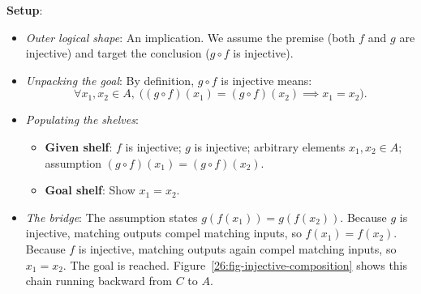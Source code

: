 \textbf{Setup}:
\begin{itemize}
\item \emph{Outer logical shape}: An implication. We assume the premise (both $f$ and $g$ are injective) and target the conclusion ($g \circ f$ is injective).
\item \emph{Unpacking the goal}: By definition, $g \circ f$ is injective means:
\[
\forall x_1, x_2 \in A, \; \bigl((g \circ f)(x_1) = (g \circ f)(x_2) \implies x_1 = x_2\bigr).
\]
\item \emph{Populating the shelves}:
\begin{itemize}
\item \textbf{Given shelf}: $f$ is injective; $g$ is injective; arbitrary elements $x_1, x_2 \in A$; assumption $(g \circ f)(x_1) = (g \circ f)(x_2)$.
\item \textbf{Goal shelf}: Show $x_1 = x_2$.
\end{itemize}
\item \emph{The bridge}: The assumption states $g(f(x_1)) = g(f(x_2))$. Because $g$ is injective, matching outputs compel matching inputs, so $f(x_1) = f(x_2)$. Because $f$ is injective, matching outputs again compel matching inputs, so $x_1 = x_2$. The goal is reached. Figure~\ref{26:fig-injective-composition} shows this chain running backward from $C$ to $A$.
\end{itemize}


